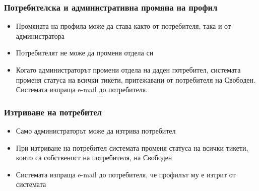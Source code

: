
\begin{frame}
  \frametitle{Потребителска и административна промяна на профил}
    \begin{itemize}
	\item Промяната на профила може да става както от потребителя, така и от администратора
	\item Потребителят не може да променя отдела си
	\item Когато администраторът промени отдела на даден потребител, системата променя статуса на всички тикети,
притежавани от потребителя на Свободен. Системата изпраща e-mail до потребителя.
    \end{itemize}
\end{frame}

\begin{frame}
  \frametitle{Изтриване на потребител}
    \begin{itemize}
	\item Само администраторът може да изтрива потребител
	\item При изтриване на потребител системата променя статуса на всички тикети,
 които са собственост на потребителя, на Свободен
	\item Системата изпраща e-mail до потребителя, че профилът му е изтрит от системата

    \end{itemize}
\end{frame}

